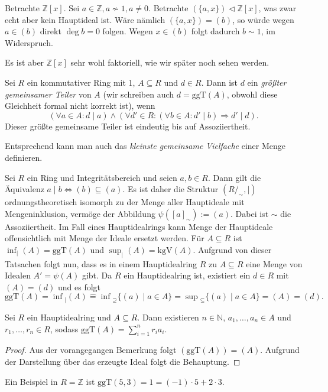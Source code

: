 \begin{example}
    Betrachte $\mathbb{Z}[x]$. Sei $a \in \mathbb{Z}, a \not\sim 1, a \neq 0$. Betrachte $(\{a,x\}) \vartriangleleft \mathbb{Z}[x]$, was zwar echt aber kein Hauptideal ist. Wäre nämlich $(\{a,x\}) = (b)$, so würde wegen $a \in (b)$ direkt $\deg b = 0$ folgen. Wegen $x \in (b)$ folgt dadurch $b\sim1$, im Widerspruch.

    Es ist aber $\mathbb{Z}[x]$ sehr wohl faktoriell, wie wir später noch sehen werden.
\end{example}

\begin{definition}
    Sei $R$ ein kommutativer Ring mit 1, $A \subseteq R$ und $d \in R$. Dann ist $d$ ein \emph{größter gemeinsamer Teiler} von $A$ (wir schreiben auch $d = \mathrm{ggT}(A)$, obwohl diese Gleichheit formal nicht korrekt ist), wenn
    $$ (\forall a \in A: d \mid a ) \land ( \forall d' \in R : ( \forall b \in A: d' \mid b ) \Rightarrow d' \mid d  ). $$
    Dieser größte gemeinsame Teiler ist eindeutig bis auf Assoziiertheit.

    Entsprechend kann man auch das \emph{kleinste gemeinsame Vielfache} einer Menge definieren.
\end{definition}


\begin{remark}
    Sei $R$ ein Ring und Integritätsbereich und seien $a,b\in R$. Dann gilt die Äquivalenz
    $a\mid b\Leftrightarrow (b)\subseteq (a)$. Es ist daher die Struktur
    $(R/_\sim,\mid)$ ordnungstheoretisch isomorph zu der Menge aller Hauptideale mit Mengeninklusion,
    vermöge der Abbildung $\psi([a]_\sim):= (a)$. Dabei ist $\sim$ die Assoziiertheit. Im Fall eines
    Hauptidealrings kann \glqq Menge der Hauptideale\grqq{} offensichtlich mit \glqq Menge der Ideale\grqq{}
    ersetzt werden. Für $A\subseteq R$ ist $\inf_{\vert}(A)=\mathrm{ggT}(A)$ und $\sup_{\vert}(A)=\mathrm{kgV}(A)$.
    Aufgrund von dieser Tatsachen folgt nun, dass es in einem Hauptidealring $R$
    zu $A\subseteq R$ eine Menge von Idealen $A'=\psi(A)$ gibt. Da $R$ ein Hauptidealring ist,
    existiert ein $d\in R$ mit $(A)=(d)$ und es folgt
    $$\mathrm{ggT}(A)=\inf{}_|(A)\widehat{=}\inf{}_{\supseteq}\{(a)\mid a\in A\}=\sup{}_\subseteq\{(a)\mid a\in A\}=(A)=(d).$$
\end{remark}

\begin{lemma}
    Sei $R$ ein Hauptidealring und $A\subseteq R$. Dann existieren
    $n\in\mathbb{N}$, $a_1,\ldots,a_n\in A$ und $r_1,\ldots,r_n\in R$, sodass $\mathrm{ggT}(A)=\sum_{i=1}^nr_ia_i$.
\end{lemma}

\begin{proof}
    Aus der vorangegangen Bemerkung folgt $(\textrm{ggT}(A))=(A)$. Aufgrund der Darstellung über das erzeugte Ideal folgt die Behauptung.
\end{proof}

\begin{example}
    Ein Beispiel in $R=\mathbb{Z}$ ist $\textrm{ggT}(5,3)=1=(-1)\cdot 5+2\cdot 3$.
\end{example}